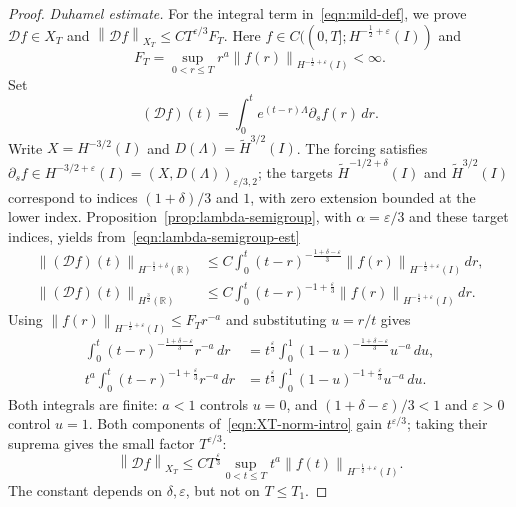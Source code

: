 \documentclass[10pt,a4paper]{amsart}
\newcommand{\R}{\mathbb{R}}
\newcommand{\hi}[1]{H^{#1}(I)}
\newcommand{\hr}[1]{H^{#1}(\R)}
\newcommand{\mc}[1]{\mathcal{#1}}
\newcommand{\norm}[1]{\left\lVert #1 \right\rVert}
\newcommand{\p}{\partial}
\newcommand{\thi}[1]{\wt H^{#1}(I)}
\newcommand{\wt}[1]{\widetilde{#1}}
\begin{document}
\begin{proof}
\emph{Duhamel estimate.}
For the integral term in~\eqref{eqn:mild-def}, we prove
$\mc Df\in X_T$ and $\norm{\mc Df}_{X_T}\le CT^{\varepsilon/3}F_T$.
Here $f\in C((0,T];\hi{-\frac12+\varepsilon})$ and
\begin{equation*}
    F_T=\sup_{0<r\le T}r^a\norm{f(r)}_{\hi{-\frac12+\varepsilon}}<\infty.
\end{equation*}
Set
\begin{equation}\label{eqn:local-D-definition}
    (\mc Df)(t)
    =\int_0^t e^{(t-r)\Lambda}\p_s f(r)\,dr.
\end{equation}
Write $X=H^{-3/2}(I)$ and $D(\Lambda)=\thi{3/2}$.
The forcing satisfies
$\p_s f\in H^{-3/2+\varepsilon}(I)=(X,D(\Lambda))_{\varepsilon/3,2}$;
the targets $\thi{-1/2+\delta}$ and $\thi{3/2}$ correspond to indices
$(1+\delta)/3$ and $1$, with zero extension bounded at the lower index.
Proposition~\ref{prop:lambda-semigroup}, with $\alpha=\varepsilon/3$
and these target indices, yields from~\eqref{eqn:lambda-semigroup-est}
\begin{equation*}
\begin{aligned}
    \norm{(\mc Df)(t)}_{\hr{-\frac12+\delta}}
    &\le C\int_0^t
    (t-r)^{-\frac{1+\delta-\varepsilon}{3}}
    \norm{f(r)}_{\hi{-\frac12+\varepsilon}}\,dr,\\
    \norm{(\mc Df)(t)}_{\hr{\frac32}}
    &\le C\int_0^t
    (t-r)^{-1+\frac{\varepsilon}{3}}
    \norm{f(r)}_{\hi{-\frac12+\varepsilon}}\,dr.
\end{aligned}
\end{equation*}
Using $\norm{f(r)}_{\hi{-\frac12+\varepsilon}}\le F_T r^{-a}$ and
substituting $u=r/t$ gives
\begin{equation*}
\begin{aligned}
    \int_0^t (t-r)^{-\frac{1+\delta-\varepsilon}{3}}r^{-a}\,dr
    &=t^{\frac{\varepsilon}{3}}
    \int_0^1 (1-u)^{-\frac{1+\delta-\varepsilon}{3}}u^{-a}\,du,\\
    t^a\int_0^t (t-r)^{-1+\frac{\varepsilon}{3}}r^{-a}\,dr
    &=t^{\frac{\varepsilon}{3}}
    \int_0^1 (1-u)^{-1+\frac{\varepsilon}{3}}u^{-a}\,du.
\end{aligned}
\end{equation*}
Both integrals are finite: $a<1$ controls $u=0$, and
$(1+\delta-\varepsilon)/3<1$ and $\varepsilon>0$ control $u=1$.
Both components of~\eqref{eqn:XT-norm-intro} gain $t^{\varepsilon/3}$;
taking their suprema gives the small factor $T^{\varepsilon/3}$:
\begin{equation}\label{eqn:local-duhamel-est}
    \norm{\mc Df}_{X_T}
    \le C T^{\frac{\varepsilon}{3}}
    \sup_{0<t\le T}t^a\norm{f(t)}_{\hi{-\frac12+\varepsilon}}.
\end{equation}
The constant depends on $\delta,\varepsilon$, but not on $T\le T_1$.


\end{proof}
\end{document}
